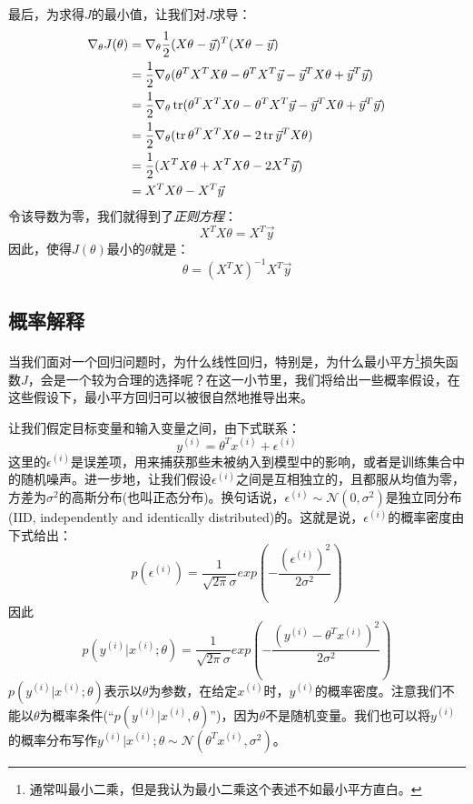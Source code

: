 最后，为求得$J$的最小值，让我们对$J$求导：
\begin{equation*}
\begin{split}
\nabla_\theta J(\theta) &= \nabla_\theta\frac{1}{2}(X\theta - \vec{y})^T(X\theta - \vec{y}) \\
&= \frac{1}{2}\nabla_\theta(\theta^TX^TX\theta - \theta^TX^T\vec{y} - \vec{y}^TX\theta + \vec{y}^T\vec{y}) \\
&= \frac{1}{2}\nabla_\theta\operatorname{tr}(\theta^TX^TX\theta - \theta^TX^T\vec{y} - \vec{y}^TX\theta + \vec{y}^T\vec{y}) \\
&= \frac{1}{2}\nabla_\theta(\operatorname{tr}\theta^TX^TX\theta - 2\operatorname{tr}\vec{y}^TX\theta) \\
&= \frac{1}{2}(X^TX\theta + X^TX\theta - 2X^T\vec{y}) \\
&= X^TX\theta - X^T\vec{y}
\end{split}
\end{equation*}
令该导数为零，我们就得到了\emph{正则方程}：
\begin{equation}
X^TX\theta = X^T\vec{y}
\end{equation}
因此，使得$J(\theta)$最小的$\theta$就是：
\begin{equation}
\theta = (X^TX)^{-1}X^T\vec{y}
\end{equation}

\subsection{概率解释}
当我们面对一个回归问题时，为什么线性回归，特别是，为什么最小平方\footnote{通常叫最小二乘，但是我认为最小二乘这个表述不如最小平方直白。}损失函数$J$，会是一个较为合理的选择呢？在这一小节里，我们将给出一些概率假设，在这些假设下，最小平方回归可以被很自然地推导出来。

让我们假定目标变量和输入变量之间，由下式联系：
\begin{equation}
y^{(i)} = \theta^Tx^{(i)} + \epsilon^{(i)}
\end{equation}
这里的$\epsilon^{(i)}$是误差项，用来捕获那些未被纳入到模型中的影响，或者是训练集合中的随机噪声。进一步地，让我们假设$\epsilon^{(i)}$之间是互相独立的，且都服从均值为零，方差为$\sigma^2$的高斯分布(也叫正态分布)。换句话说，$\epsilon^{(i)} \sim \mathcal{N}(0, \sigma^2)$是独立同分布(IID, independently and identically distributed)的。这就是说，$\epsilon^{(i)}$的概率密度由下式给出：
\begin{equation*}
p(\epsilon^{(i)}) = \frac{1}{\sqrt{2\pi}\sigma}exp\left(-\frac{(\epsilon^{(i)})^2}{2\sigma^2}\right)
\end{equation*}
因此
\begin{equation}
p(y^{(i)}|x^{(i)};\theta) = \frac{1}{\sqrt{2\pi}\sigma}exp\left(-\frac{(y^{(i)} - \theta^Tx^{(i)})^2}{2\sigma^2}\right)
\end{equation}
$p(y^{(i)}|x^{(i)};\theta)$表示以$\theta$为参数，在给定$x^{(i)}$时，$y^{(i)}$的概率密度。注意我们不能以$\theta$为概率条件(``$p(y^{(i)}|x^{(i)},\theta)$'')，因为$\theta$不是随机变量。我们也可以将$y^{(i)}$的概率分布写作$y^{(i)}|x^{(i)};\theta \sim \mathcal{N}(\theta^Tx^{(i)}, \sigma^2)$。

